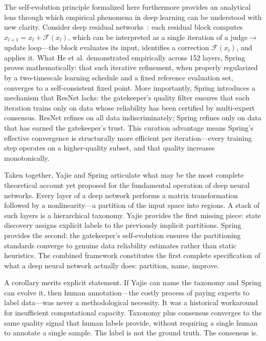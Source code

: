 \documentclass[11pt,a4paper]{article}
\theoremstyle{plain}
\theoremstyle{definition}
\theoremstyle{remark}
\begin{document}
The self-evolution principle formalized here furthermore provides an analytical lens through which empirical phenomena in deep learning can be understood with new clarity. Consider deep residual networks~\citep{he2016}: each residual block computes $x_{l+1} = x_l + \mathcal{F}(x_l)$, which can be interpreted as a single iteration of a judge$\to$update loop—the block evaluates its input, identifies a correction $\mathcal{F}(x_l)$, and applies it. What He et al. demonstrated empirically across 152 layers, Spring proves mathematically: that such iterative refinement, when properly regularized by a two-timescale learning schedule and a fixed reference evaluation set, converges to a self-consistent fixed point. More importantly, Spring introduces a mechanism that ResNet lacks: the gatekeeper's quality filter ensures that each iteration trains only on data whose reliability has been certified by multi-expert consensus. ResNet refines on all data indiscriminately; Spring refines only on data that has earned the gatekeeper's trust. This curation advantage means Spring's effective convergence is structurally more efficient per iteration—every training step operates on a higher-quality subset, and that quality increases monotonically.

Taken together, Yajie and Spring articulate what may be the most complete theoretical account yet proposed for the fundamental operation of deep neural networks. Every layer of a deep network performs a matrix transformation followed by a nonlinearity—a partition of the input space into regions. A stack of such layers is a hierarchical taxonomy. Yajie provides the first missing piece: state discovery assigns explicit labels to the previously implicit partitions. Spring provides the second: the gatekeeper's self-evolution ensures the partitioning standards converge to genuine data reliability estimates rather than static heuristics. The combined framework constitutes the first complete specification of what a deep neural network actually does: partition, name, improve.

A corollary merits explicit statement. If Yajie can name the taxonomy and Spring can evolve it, then human annotation—the costly process of paying experts to label data—was never a methodological necessity. It was a historical workaround for insufficient computational capacity. Taxonomy plus consensus converges to the same quality signal that human labels provide, without requiring a single human to annotate a single sample. The label is not the ground truth. The consensus is.
\end{document}
